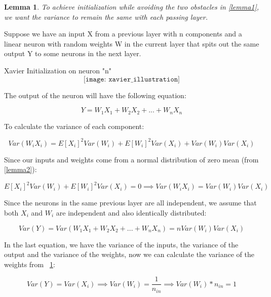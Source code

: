 \documentclass[a4paper, 12pt]{report}
\newtheorem{lemma}{Lemma}
\begin{document}
\begin{lemma}\label{lemma3}
To achieve initialization while avoiding the two obstacles in \cref{lemma1}, we want the variance to remain the same with each passing layer.	
\end{lemma}
\newpage
Suppose we have an input X from a previous layer with n components and a linear neuron with random weights W in the current layer that spits out the same output Y to some neurons in the next layer.
\begin{blockfigure}{Xavier Initialization on neuron "n"}
		\[ \texttt{[image: xavier\_illustration]} \]
\end{blockfigure}
The output of the neuron will have the following equation:
\begin{center}
	\begin{equation}
		Y = W_1X_1 + W_2X_2 + ... + W_n X_n \label{eq:1}
	\end{equation}
\end{center}
To calculate the variance of each component:
\begin{center}
	\begin{equation}
		Var(W_iX_i) = E[X_i]^2 Var(W_i) + E[W_i]^2 Var(X_i) + Var(W_i)Var(X_i) \label{eq:2}
	\end{equation}
\end{center}
Since our inputs and weights come from a normal distribution of zero mean (from \cref{lemma2}):
\begin{center}
	\begin{equation}
		E[X_i]^2 Var(W_i) + E[W_i]^2 Var(X_i) = 0 \implies
		Var(W_iX_i) = Var(W_i)Var(X_i) \label{eq:3}
	\end{equation}
\end{center}
Since the neurons in the same previous layer are all independent, we assume that both $ X_i $ and $ W_i $  are independent and also identically distributed:
\begin{center}
	\begin{equation}
	 Var(Y) = Var(W_1X_1 + W_2X_2 + ... + W_n X_n) = nVar(W_i)Var(X_i) \label{eq:4}
	\end{equation}
\end{center}
In the last equation, we have the variance of the inputs, the variance of the output and the variance of the weights, now we can calculate the variance of the weights from ~\cref{lemma3}:
\begin{center}
	\begin{equation}
	 Var(Y) = Var(X_i) \implies Var(W_i) = \frac{1}{n_{in}} \implies Var(W_i) * n_{in} = 1  \label{eq:5}
	\end{equation}
\end{center}
\end{document}
